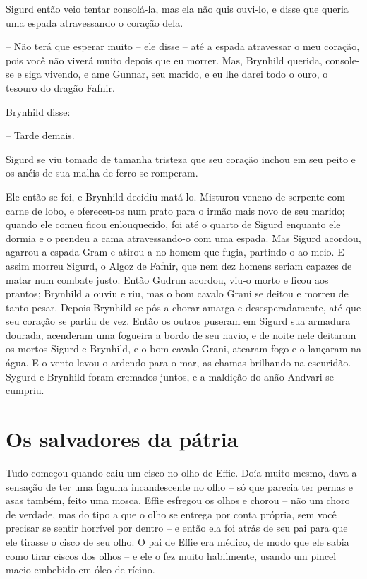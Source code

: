 Sigurd então veio tentar consolá-la, mas ela não quis ouvi-lo, e disse
que queria uma espada atravessando o coração dela. 

-- Não terá que esperar muito -- ele disse -- até a espada atravessar o
meu coração, pois você não viverá muito depois que eu morrer. Mas,
Brynhild querida, console-se e siga vivendo, e ame Gunnar, seu
marido, e eu lhe darei todo o ouro, o tesouro do dragão Fafnir. 

Brynhild disse:

-- Tarde demais.

Sigurd se viu tomado de tamanha tristeza que seu coração inchou em seu
peito e os anéis de sua malha de ferro se romperam.

Ele então se foi, e Brynhild decidiu matá-lo. Misturou veneno de
serpente com carne de lobo, e ofereceu-os num prato para o irmão mais
novo de seu marido; quando ele comeu ficou enlouquecido, foi até o
quarto de Sigurd enquanto ele dormia e o prendeu a cama
atravessando-o com uma espada. Mas Sigurd acordou, agarrou a espada
Gram e atirou-a no homem que fugia, partindo-o ao meio. E assim
morreu Sigurd, o Algoz de Fafnir, que nem dez homens seriam capazes
de matar num combate justo. Então Gudrun acordou, viu-o morto e ficou
aos prantos; Brynhild a ouviu e riu, mas o bom cavalo Grani se deitou
e morreu de tanto pesar. Depois Brynhild se pôs a chorar amarga e
desesperadamente, até que seu coração se partiu de vez. Então os
outros puseram em Sigurd sua armadura dourada, acenderam uma fogueira
a bordo de seu navio, e de noite nele deitaram os mortos Sigurd e
Brynhild, e o bom cavalo Grani, atearam fogo e o lançaram na água. E
o vento levou-o ardendo para o mar, as chamas brilhando na escuridão.
Sygurd e Brynhild foram cremados juntos, e a maldição do anão Andvari
se cumpriu. 

\chapter{Os salvadores da pátria}

Tudo começou quando caiu um cisco no olho de Effie. Doía muito mesmo,
dava a sensação de ter uma fagulha incandescente no olho -- só que
parecia ter pernas e asas também, feito uma mosca. Effie esfregou os
olhos e chorou -- não um choro de verdade, mas do tipo a que o olho se
entrega por conta própria, sem você precisar se sentir horrível por
dentro -- e então ela foi atrás de seu pai para que ele tirasse o
cisco de seu olho. O pai de Effie era médico, de modo que ele sabia
como tirar ciscos dos olhos -- e ele o fez muito habilmente, usando um
pincel macio embebido em óleo de rícino.


